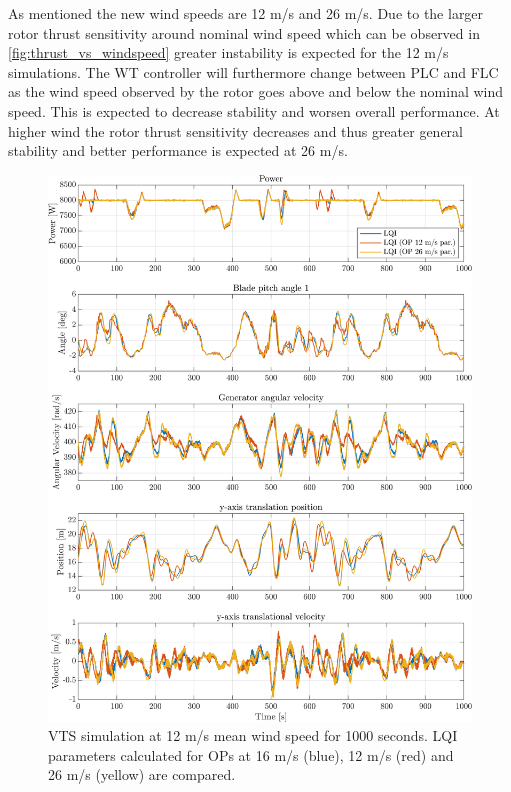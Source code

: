 As mentioned the new wind speeds are 12 m/s and 26 m/s. Due to the larger rotor thrust sensitivity around nominal wind speed which can be observed in \cref{fig:thrust_vs_windspeed} greater instability is expected for the 12 m/s simulations. The WT controller will furthermore change between PLC and FLC as the wind speed observed by the rotor goes above and below the nominal wind speed. This is expected to decrease stability and worsen overall performance. At higher wind the rotor thrust sensitivity decreases and thus greater general stability and better performance is expected at 26 m/s.
\begin{figure}[ht]
	\centering
	\includegraphics[width=0.7\linewidth]{Graphics/TestResults/VTSplotting/20_pow_th_w_py_vy.png}
	\caption{VTS simulation at 12 m/s mean wind speed for 1000 seconds. LQI parameters calculated for OPs at 16 m/s (blue), 12 m/s (red) and 26 m/s (yellow) are compared.}
	\label{fig:vts_20_pow_th_w_py_vy}
\end{figure}
